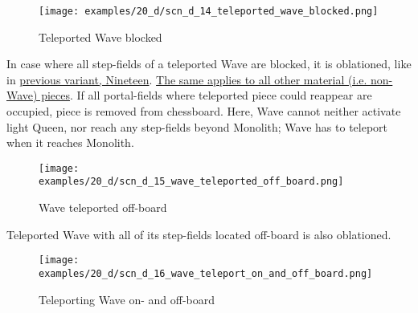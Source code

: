 \clearpage %

\vspace*{-2.3\baselineskip}
\noindent
\begin{figure}[!h]
\texttt{[image: examples/20\_d/scn\_d\_14\_teleported\_wave\_blocked.png]}
\vspace*{-1.3\baselineskip}
\caption{Teleported Wave blocked}
\label{fig:scn_d_14_teleported_wave_blocked}
\end{figure}

\vspace*{-0.3\baselineskip}
In case where all step-fields of a teleported Wave are blocked, it is oblationed, like in
\hyperref[fig:scn_n_06_teleport_wave_blocked]{previous variant, Nineteen}. \newline
\hyperref[fig:scn_n_03_teleport_move_2]{The same applies to all other material (i.e. non-Wave) pieces}.
If all portal-fields where teleported piece could reappear are occupied, piece is removed
from chessboard. \newline
Here, Wave cannot neither activate light Queen, nor reach any step-fields beyond Monolith;
Wave has to teleport when it reaches Monolith.

\clearpage %

\vspace*{-1.4\baselineskip}
\noindent
\begin{figure}[!h]
\texttt{[image: examples/20\_d/scn\_d\_15\_wave\_teleported\_off\_board.png]}
\vspace*{-1.3\baselineskip}
\caption{Wave teleported off-board}
\label{fig:scn_d_15_wave_teleported_off_board}
\end{figure}

\vspace*{-0.3\baselineskip}
Teleported Wave with all of its step-fields located off-board is also oblationed.

\clearpage %

\vspace*{-1.4\baselineskip}
\noindent
\begin{figure}[!h]
\texttt{[image: examples/20\_d/scn\_d\_16\_wave\_teleport\_on\_and\_off\_board.png]}
\vspace*{-1.3\baselineskip}
\caption{Teleporting Wave on- and off-board}
\label{fig:scn_d_16_wave_teleport_on_and_off_board}
\end{figure}

